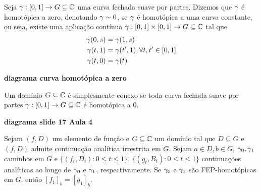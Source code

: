     \begin{definicao}
    \label{def-homotopica-a-zero}
        Seja $\gamma:[0,1]\to G\subseteq\mathbb{C}$ uma curva fechada suave por partes.
        Dizemos que $\gamma$ é homotópica a zero, denotando $\gamma\sim 0$, se $\gamma$
        é homotópica a uma curva constante, ou seja, existe uma aplicação contínua 
        $\gamma:[0,1]\times [0,1] \to G\subseteq\mathbb{C}$ tal que
        \begin{align*}
            \gamma(0,s) &= \gamma(1,s) \\
            \gamma(t,1) &= \gamma(t',1), \forall t, t'\in [0,1] \\
            \gamma(t,0) &= \gamma(t)
        \end{align*}
        \begin{center}
            \textbf{diagrama curva homotópica a zero}
        \end{center}
    \end{definicao}

    \begin{definicao}
    \label{def-simplesmente-conexo}
        Um domínio $G\subseteq\mathbb{C}$ é simplesmente conexo se toda curva fechada
        suave por partes $\gamma: [0,1]\to G\subseteq\mathbb{C}$ é homotópica a 0.
        \begin{center}
            \textbf{diagrama slide 17 Aula 4}
        \end{center}
    \end{definicao}

    \begin{teorema}
    \label{teo-monodromia}
        Sejam $(f,D)$ um elemento de função e $G\subseteq\mathbb{C}$ um domínio tal que 
        $D\subseteq G$ e $(f,D)$ admite continuação analítica irrestrita em $G$. Sejam
        $a\in D, b\in G$, $\gamma_0, \gamma_1$ caminhos em $G$ e 
        $\{ (f_t, D_t) : 0\leq t\leq 1 \}$, $\{ (g_t, B_t) : 0\leq t\leq 1 \}$ continuações
        analíticas ao longo de $\gamma_0$ e $\gamma_1$, respectivamente. 
        Se $\gamma_0$ e $\gamma_1$ são FEP-homotópicas em $G$, então $[f_1]_b = [g_1]_b$.
    \end{teorema}

